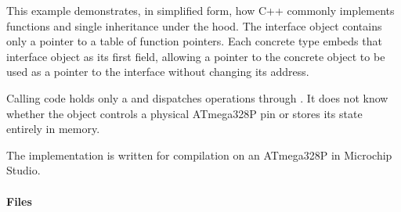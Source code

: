 This example demonstrates, in simplified form, how C++ commonly implements  functions
and single inheritance under the hood. The interface object contains only a pointer to a table of
function pointers. Each concrete type embeds that interface object as its first field, allowing a
pointer to the concrete object to be used as a pointer to the interface without changing its
address.

Calling code holds only a  and dispatches operations through
. It does not know whether the object controls a physical ATmega328P pin or
stores its state entirely in memory.

The implementation is written for compilation on an ATmega328P in Microchip Studio.

\paragraph{Files}
